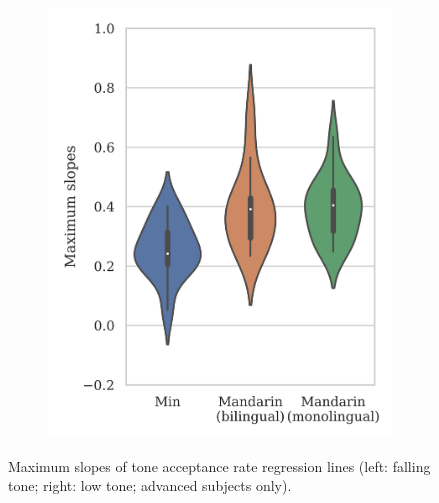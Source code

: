 \documentclass[12pt]{report}
\begin{document}
\begin{CJK}{UTF8}{bsmi}
\begin{figure}[hbt!]
\begin{subfigure}[b]{.49\textwidth}
\includegraphics[width=\textwidth]{Figures/E3/Result_21_advanced.png}
\end{subfigure}

\caption{Maximum slopes of tone acceptance rate regression lines (left: falling tone; right: low tone; advanced subjects only).}
\label{Figure:E3BoxPlot}
\end{figure}

%


\end{CJK}
\end{document}

